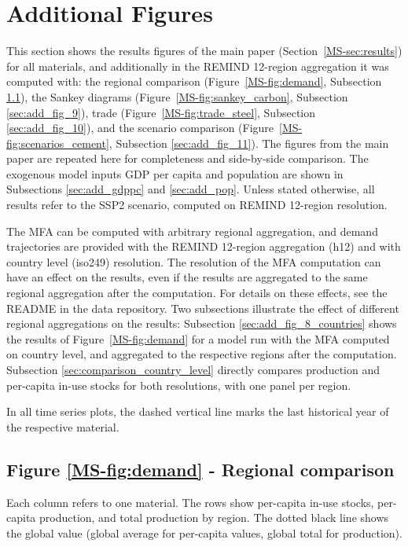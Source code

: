 
\section{Additional Figures} \label{sec:add_figures}

This section shows the results figures of the main paper (Section~\ref{MS-sec:results}) for all materials, and additionally in the REMIND 12-region aggregation it was computed with: the regional comparison (Figure~\ref{MS-fig:demand}, Subsection \ref{sec:add_fig_8}), the Sankey diagrams (Figure~\ref{MS-fig:sankey_carbon}, Subsection \ref{sec:add_fig_9}), trade (Figure~\ref{MS-fig:trade_steel}, Subsection \ref{sec:add_fig_10}), and the scenario comparison (Figure~\ref{MS-fig:scenarios_cement}, Subsection \ref{sec:add_fig_11}). The figures from the main paper are repeated here for completeness and side-by-side comparison.
The exogenous model inputs GDP per capita and population are shown in Subsections \ref{sec:add_gdppc} and \ref{sec:add_pop}.
Unless stated otherwise, all results refer to the SSP2 scenario, computed on REMIND 12-region resolution.

The MFA can be computed with arbitrary regional aggregation, and demand trajectories are provided with the REMIND 12-region aggregation (h12) and with country level (iso249) resolution.
The resolution of the MFA computation can have an effect on the results, even if the results are aggregated to the same regional aggregation after the computation. For details on these effects, see the README in the data repository.
Two subsections illustrate the effect of different regional aggregations on the results: Subsection \ref{sec:add_fig_8_countries} shows the results of Figure~\ref{MS-fig:demand} for a model run with the MFA computed on country level, and aggregated to the respective regions after the computation. Subsection \ref{sec:comparison_country_level} directly compares production and per-capita in-use stocks for both resolutions, with one panel per region.

In all time series plots, the dashed vertical line marks the last historical year of the respective material.

\subsection{Figure \texorpdfstring{\ref{MS-fig:demand}}{5} - Regional comparison} \label{sec:add_fig_8}

Each column refers to one material.
The rows show per-capita in-use stocks, per-capita production, and total production by region.
The dotted black line shows the global value (global average for per-capita values, global total for production).

